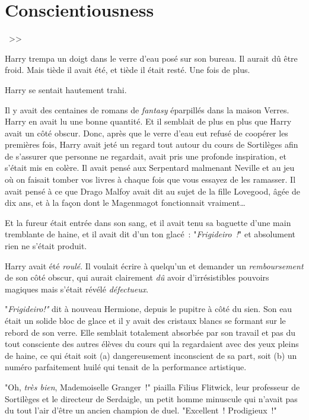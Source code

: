 \chapter{Conscientiousness}

~>>

\hplettrineextrapara
Harry trempa un doigt dans le verre d'eau posé sur son bureau. Il aurait dû être froid. Mais tiède il avait été, et tiède il était resté. Une fois de plus.

Harry se sentait hautement trahi.

Il y avait des centaines de romans de \emph{fantasy} éparpillés dans la maison Verres. Harry en avait lu une bonne quantité. Et il semblait de plus en plus que Harry avait un côté obscur. Donc, après que le verre d'eau eut refusé de coopérer les premières fois, Harry avait jeté un regard tout autour du cours de Sortilèges afin de s'assurer que personne ne regardait, avait pris une profonde inspiration, et s'était mis en colère. Il avait pensé aux Serpentard malmenant Neville et au jeu où on faisait tomber vos livres à chaque fois que vous essayez de les ramasser. Il avait pensé à ce que Drago Malfoy avait dit au sujet de la fille Lovegood, âgée de dix ans, et à la façon dont le Magenmagot fonctionnait vraiment…

Et la fureur était entrée dans son sang, et il avait tenu sa baguette d'une main tremblante de haine, et il avait dit d'un ton glacé~: "\emph{Frigideiro~!}" et absolument rien ne s'était produit.

Harry avait été \emph{roulé}. Il voulait écrire à quelqu'un et demander un \emph{remboursement} de son côté obscur, qui aurait clairement \emph{dû} avoir d'irrésistibles pouvoirs magiques mais s'était révélé \emph{défectueux}.

"\emph{Frigideiro!"} dit à nouveau Hermione, depuis le pupitre à côté du sien. Son eau était un solide bloc de glace et il y avait des cristaux blancs se formant sur le rebord de son verre. Elle semblait totalement absorbée par son travail et pas du tout consciente des autres élèves du cours qui la regardaient avec des yeux pleins de haine, ce qui était soit (a) dangereusement inconscient de sa part, soit (b) un numéro parfaitement huilé qui tenait de la performance artistique.

"Oh, \emph{très bien}, Mademoiselle Granger~!" piailla Filius Flitwick, leur professeur de Sortilèges et le directeur de Serdaigle, un petit homme minuscule qui n'avait pas du tout l'air d'être un ancien champion de duel. "Excellent~! Prodigieux~!"

